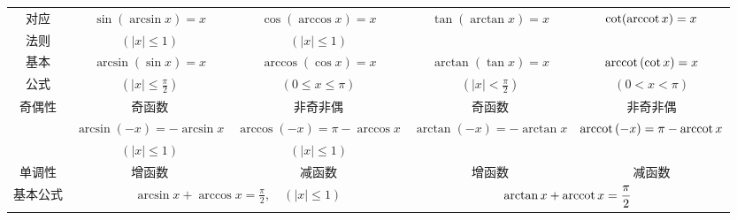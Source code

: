 \begin{landscape}
\begin{tabular}{c|cccc}
对应&$\sin(\arcsin x)=x$&$\cos(\arccos x)=x$&$\tan(\arctan x)=x$&$\cot({\rm arccot\,} x)=x$\\
法则&$(|x|\le 1)$&$(|x|\le 1)$\\
基本& $\arcsin(\sin x)=x$& $\arccos(\cos x)=x$& $\arctan(\tan x)=x$& ${\rm arccot\,}(\cot x)=x$\\
公式&$\left(|x|\le \frac{\pi}{2}\right)$& $(0\le x\le \pi)$ &$\left(|x|<\frac{\pi}{2}\right)$&$(0<x<\pi)$\\ 
奇偶性&奇函数 &非奇非偶& 奇函数&非奇非偶\\
&$\arcsin(-x)=-\arcsin x$&$\arccos(-x)=\pi-\arccos x$&$\arctan(-x)=-\arctan x$&${\rm arccot\,}(-x)=\pi-{\rm arccot\,} x$\\
&$(|x|\le 1)$&$(|x|\le 1)$\\ 
单调性& 增函数&减函数& 增函数&减函数\\  
基本公式&\multicolumn{2}{c}{$\arcsin x+\arccos x=\frac{\pi}{2},\quad (|x|\le 1)$}&\multicolumn{2}{c}{$\arctan x+{\rm arccot\,} x=\dfrac{\pi}{2}$}\\
\hline
\end{tabular}
\end{landscape}




































































